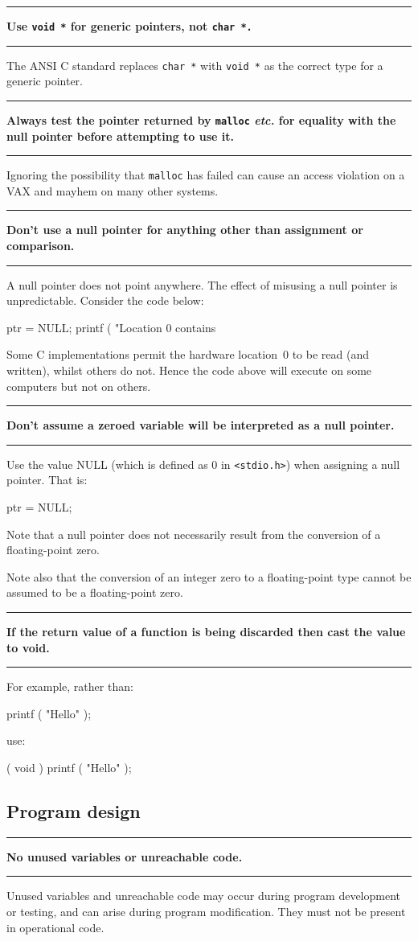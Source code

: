\documentclass[twoside,11pt,nolof,noabs]{starlink}
\newcounter{sruleno}
\newcommand{\srule}[1]{
    \addtocounter{sruleno}{1}
    \goodbreak
    \rule{\textwidth}{0.3mm}
    \textbf{#1} \scpushright{\textbf{\thesruleno}}
    \rule{\textwidth}{0.1mm}
}
\begin{document}
\srule{Use \texttt{void *} for generic pointers, not \texttt{char *.}}
The ANSI C standard replaces \texttt{char~*} with \texttt{void~*} as the
correct type for a generic pointer.


\srule{Always test the pointer returned by \texttt{malloc} \textit{etc.}
for equality with   the null pointer before attempting to use it.}
Ignoring the possibility that \texttt{malloc} has failed
can cause an access violation
on a  VAX and mayhem on many other systems.

\srule{Don't use a null pointer for anything other than assignment or
comparison.}
A null pointer does not point anywhere. The effect of misusing a
null pointer is unpredictable.
Consider the code below:
\begin{terminalv}
      ptr = NULL;
      printf ( "Location 0 contains %
\end{terminalv}
Some C implementations permit the
hardware location~0 to be read (and written), whilst others do not.
Hence the code above will execute on some computers but not on others.

\srule{Don't assume a zeroed variable will be interpreted as a null pointer.}
Use the value NULL (which is defined as 0 in \verb!<stdio.h>!)
when assigning a null pointer. That is:
\begin{terminalv}
      ptr = NULL;
\end{terminalv}
Note that a null pointer does not necessarily
result from the conversion of a floating-point zero.

Note also that the conversion of an integer zero to a floating-point type
cannot be assumed to be a floating-point zero.

\srule{If the return value of a function is being discarded then
cast the  value to void.}
For example, rather than:
\begin{terminalv}
      printf ( "Hello\n" );
\end{terminalv}
use:
\begin{terminalv}
      ( void ) printf ( "Hello\n" );
\end{terminalv}

\newpage
\subsection{Program design}

\srule{No unused variables or unreachable code.}
Unused variables and unreachable code may occur during program development or
testing, and can arise during program modification.  They must not be present
in operational code.
\end{document}

